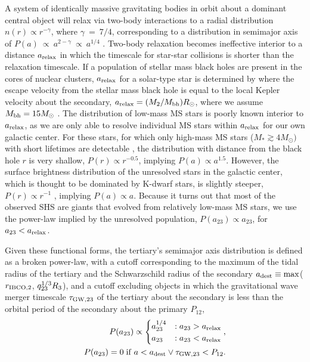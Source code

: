 \documentclass[a4paper,twocolumn]{emulateapj}
\begin{document}
{A system of identically massive gravitating bodies in orbit about a dominant central object will relax via two-body interactions to a radial distribution $n(r) \propto r^{-\gamma}$, where $\gamma~=~7/4$, corresponding to a distribution in semimajor axis of $P(a)~\propto~a^{2-\gamma}~\propto~a^{1/4}$ \citep{Bahcall:1976a}. Two-body relaxation becomes ineffective interior to a distance $a_{\rm relax}$ in which the timescale for star-star collisions is shorter than the relaxation timescale. If a population of stellar mass black holes are present in the cores of nuclear clusters, $a_{\rm relax}$ for a solar-type star is determined by where the escape velocity from the stellar mass black hole is equal to the local Kepler velocity about the secondary, $a_{\rm relax} = (M_{2} / M_{\rm bh}) R_{\odot}$, where we assume $M_{\rm bh} = 15 M_{\odot}$ \citep{OLeary:2008a}. The distribution of low-mass MS stars is poorly known interior to $a_{\rm relax}$, as we are only able to resolve individual MS stars within $a_{\rm relax}$ for our own galactic center. For these stars, for which only high-mass MS stars ($M_{\ast} \gtrsim 4 M_{\odot})$ with short lifetimes are detectable \citep{Ghez:2005a}, the distribution with distance from the black hole $r$ is very shallow, $P(r) \propto r^{-0.5}$, implying $P(a) \propto a^{1.5}$. However, the surface brightness distribution of the unresolved stars in the galactic center, which is thought to be dominated by K-dwarf stars, is slightly steeper, $P(r) \propto r^{-1}$ \citep{Yusef-Zadeh:2012a}, implying $P(a) \propto a$. Because it turns out that most of the observed SHS are giants that evolved from relatively low-mass MS stars, we use the power-law implied by the unresolved population, $P(a_{23}) \propto a_{23}$, for $a_{23} < a_{\rm relax}$.

Given these functional forms, the tertiary's semimajor axis distribution is defined as a broken power-law, with a cutoff corresponding to the maximum of the tidal radius of the tertiary and the Schwarzschild radius of the secondary $a_{\rm dest} \equiv \max$($r_{\rm IBCO,2}$, $q_{23}^{\smash{1/3}} R_{3}$), and a cutoff excluding objects in which the gravitational wave merger timescale $\tau_{\rm GW,23}$ of the tertiary about the secondary \citep[see][]{Peters:1964a} is less than the orbital period of the secondary about the primary $P_{12}$,
\begin{eqnarray}
P(a_{23}) \propto
\begin{cases}
a_{23}^{1/4} &: a_{23} > a_{\rm relax}\\
a_{23} &: a_{23} < a_{\rm relax}\\
\end{cases},\label{eq:adist}\\
P(a_{23}) = 0 {\rm\;if\;} a < a_{\rm dest} \lor \tau_{\rm GW,23} < P_{12}.\nonumber
\end{eqnarray}

}
\end{document}

